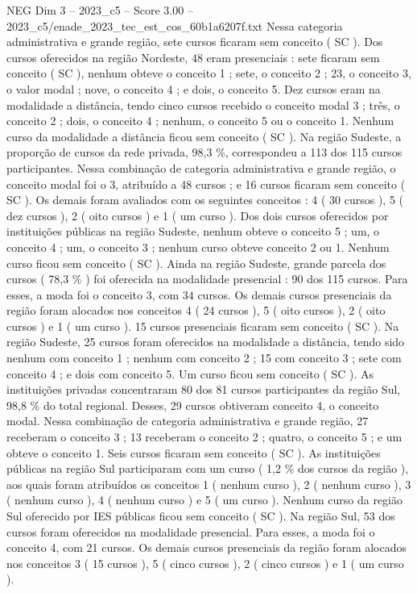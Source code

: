 \begin{textsample}{NEG Dim 3 – 2023\_c5 – Score 3.00 – 2023\_c5/enade\_2023\_tec\_est\_cos\_60b1a6207f.txt}
Nessa categoria administrativa e grande região, sete cursos ficaram sem conceito ( SC ).
Dos cursos oferecidos na região Nordeste, 48 eram presenciais : sete ficaram sem conceito ( SC ), nenhum obteve o conceito 1 ; sete, o conceito 2 ; 23, o conceito 3, o valor modal ; nove, o conceito 4 ; e dois, o conceito 5.
Dez cursos eram na modalidade a distância, tendo cinco cursos recebido o conceito modal 3 ; três, o conceito 2 ; dois, o conceito 4 ; nenhum, o conceito 5 ou o conceito 1.
Nenhum curso da modalidade a distância ficou sem conceito ( SC ).
Na região Sudeste, a proporção de cursos da rede privada, 98,3 \%, correspondeu a 113 dos 115 cursos participantes.
Nessa combinação de categoria administrativa e grande região, o conceito modal foi o 3, atribuído a 48 cursos ; e 16 cursos ficaram sem conceito ( SC ).
Os demais foram avaliados com os seguintes conceitos : 4 ( 30 cursos ), 5 ( dez cursos ), 2 ( oito cursos ) e 1 ( um curso ).
Dos dois cursos oferecidos por instituições públicas na região Sudeste, nenhum obteve o conceito 5 ; um, o conceito 4 ; um, o conceito 3 ; nenhum curso obteve conceito 2 ou 1.
Nenhum curso ficou sem conceito ( SC ).
Ainda na região Sudeste, grande parcela dos cursos ( 78,3 \% ) foi oferecida na modalidade presencial : 90 dos 115 cursos.
Para esses, a moda foi o conceito 3, com 34 cursos.
Os demais cursos presenciais da região foram alocados nos conceitos 4 ( 24 cursos ), 5 ( oito cursos ), 2 ( oito cursos ) e 1 ( um curso ). 15 cursos presenciais ficaram sem conceito ( SC ).
Na região Sudeste, 25 cursos foram oferecidos na modalidade a distância, tendo sido nenhum com conceito 1 ; nenhum com conceito 2 ; 15 com conceito 3 ; sete com conceito 4 ; e dois com conceito 5.
Um curso ficou sem conceito ( SC ).
As instituições privadas concentraram 80 dos 81 cursos participantes da região Sul, 98,8 \% do total regional.
Desses, 29 cursos obtiveram conceito 4, o conceito modal.
Nessa combinação de categoria administrativa e grande região, 27 receberam o conceito 3 ; 13 receberam o conceito 2 ; quatro, o conceito 5 ; e um obteve o conceito 1.
Seis cursos ficaram sem conceito ( SC ).
As instituições públicas na região Sul participaram com um curso ( 1,2 \% dos cursos da região ), aos quais foram atribuídos os conceitos 1 ( nenhum curso ), 2 ( nenhum curso ), 3 ( nenhum curso ), 4 ( nenhum curso ) e 5 ( um curso ).
Nenhum curso da região Sul oferecido por IES públicas ficou sem conceito ( SC ).
Na região Sul, 53 dos cursos foram oferecidos na modalidade presencial.
Para esses, a moda foi o conceito 4, com 21 cursos.
Os demais cursos presenciais da região foram alocados nos conceitos 3 ( 15 cursos ), 5 ( cinco cursos ), 2 ( cinco cursos ) e 1 ( um curso ).

\end{textsample}
